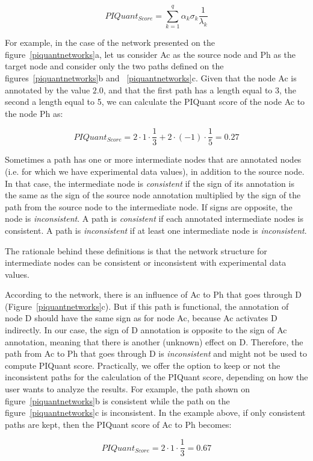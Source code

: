 \documentclass[10pt]{bmc_article}
\newenvironment{bmcformat}{\baselineskip20pt\sloppy\setboolean{publ}{false}}{\baselineskip20pt\sloppy}
\begin{document}
\begin{bmcformat}
$$
 PIQuant_{Score} = \sum_{k=1}^{q} \alpha_{k} \sigma_{k} \frac{1}{\lambda_{k}}
$$

For example, in the case of the network presented on the figure~\ref{piquantnetworks}a, let us
consider Ac as the source node and Ph as the target node and consider only the two
paths defined on the figures~\ref{piquantnetworks}b and
~\ref{piquantnetworks}c. Given that the
node Ac is annotated by the value $2.0$, and that the first path has a length
equal to 3, the second a length equal to 5, we can calculate the PIQuant score 
of the node Ac to the node Ph as:

$$
 PIQuant_{Score} = 2 \cdot 1 \cdot \frac{1}{3} + 2 \cdot (-1) \cdot \frac{1}{5}
= 0.27
$$


Sometimes a path has one or more intermediate nodes that are annotated nodes (i.e. for which we have experimental data values), 
in addition to the source node.
In that case, the intermediate node is \textit{consistent} if the sign of its 
annotation is the same as the sign of the source node annotation multiplied by
the sign of the 
path from the source node to the intermediate node. If signs are opposite, the
node is \textit{inconsistent}. 
A path is \textit{consistent} if each annotated intermediate nodes is
consistent. A path is \textit{inconsistent} if at least one intermediate node is
\textit{inconsistent}. 

The rationale behind these definitions is that the
network structure for intermediate nodes can be consistent or inconsistent with
experimental data values.

According to the network, there is an influence of Ac to Ph
that goes through D (Figure~\ref{piquantnetworks}c). But if this path
is functional, the annotation of node D should have the same sign as for node Ac, because
Ac activates D indirectly. In our case, the sign of D annotation is opposite to
the sign of Ac annotation, meaning that there is another (unknown) effect on D.
Therefore, the path from Ac to Ph that goes through D is \textit{inconsistent} and
might not be used to compute PIQuant score. Practically, we offer the option to
keep or not the inconsistent paths for the calculation of the PIQuant score,
depending on how the user wants to analyze the results. For example, the path
shown on figure~\ref{piquantnetworks}b is consistent while
the path on the figure~\ref{piquantnetworks}c is inconsistent. In the example
above, if only consistent paths are kept, then the PIQuant score of Ac to Ph
becomes:

$$
 PIQuant_{Score} = 2 \cdot 1 \cdot \frac{1}{3} = 0.67
$$


\end{bmcformat}
\end{document}
